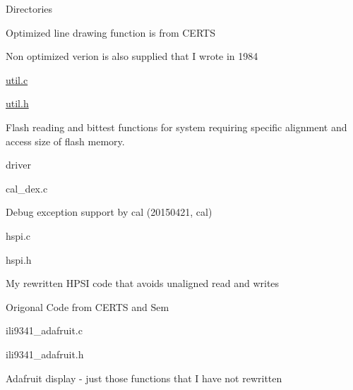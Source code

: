 \begin{DoxyParagraph}{Directories}
\begin{DoxyItemize}
\begin{DoxyItemize}
\begin{DoxyItemize}
\begin{DoxyItemize}
\item Optimized line drawing function is from C\-E\-R\-T\-S
\item Non optimized verion is also supplied that I wrote in 1984
\end{DoxyItemize}
\end{DoxyItemize}
\item \hyperlink{util_8c}{util.\-c}
\item \hyperlink{util_8h}{util.\-h}
\begin{DoxyItemize}
\item Flash reading and bittest functions for system requiring specific alignment and access size of flash memory.
\end{DoxyItemize}
\end{DoxyItemize}
\item driver
\begin{DoxyItemize}
\item cal\-\_\-dex.\-c
\begin{DoxyItemize}
\item Debug exception support by cal (20150421, cal)
\end{DoxyItemize}
\item hspi.\-c
\item hspi.\-h
\begin{DoxyItemize}
\item My rewritten H\-P\-S\-I code that avoids unaligned read and writes
\item Origonal Code from C\-E\-R\-T\-S and Sem
\end{DoxyItemize}
\item ili9341\-\_\-adafruit.\-c
\item ili9341\-\_\-adafruit.\-h
\begin{DoxyItemize}
\item Adafruit display -\/ just those functions that I have not rewritten
\end{DoxyItemize}
\end{DoxyItemize}
\end{DoxyItemize}
\end{DoxyParagraph}

